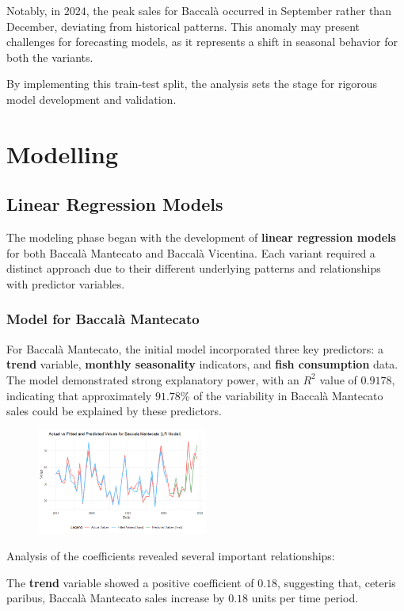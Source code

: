\documentclass[10pt,twocolumn,letterpaper]{article}
\begin{document}
Notably, in $2024$, the peak sales for Baccalà occurred in September rather than December, deviating from historical patterns. This anomaly may present challenges for forecasting models, as it represents a shift in seasonal behavior for both the variants.

By implementing this train-test split, the analysis sets the stage for rigorous model development and validation. 


\section{Modelling}
\subsection{Linear Regression Models}
The modeling phase began with the development of \textbf{linear regression models} for both Baccalà Mantecato and Baccalà Vicentina. Each variant required a distinct approach due to their different underlying patterns and relationships with predictor variables.

\subsubsection{Model for Baccalà Mantecato}
For Baccalà Mantecato, the initial model incorporated three key predictors: a \textbf{trend} variable, \textbf{monthly seasonality} indicators, and \textbf{fish consumption} data. The model demonstrated strong explanatory power, with an $R^2$ value of $0.9178$, indicating that approximately $91.78$\% of the variability in Baccalà Mantecato sales could be explained by these predictors.

\begin{figure}[H]
    \centering
    \includegraphics[width=0.5\textwidth]{PlotsBEFD/PRED_LR_MAN.png} 
    \caption{}
    \label{fig:PRED_LR_MAN}
\end{figure}

Analysis of the coefficients revealed several important relationships:

The \textbf{trend} variable showed a positive coefficient of $0.18$, suggesting that, ceteris paribus, Baccalà Mantecato sales increase by $0.18$ units per time period.
\end{document}
